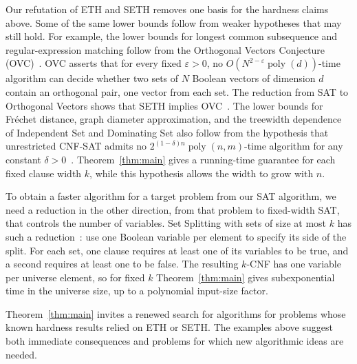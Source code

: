 \documentclass[11pt,reqno]{amsart}
\numberwithin{equation}{section}
\theoremstyle{definition}\newtheorem{definition}[theorem]{Definition}
\theoremstyle{remark}\newtheorem{remark}[theorem]{Remark}
\newcommand{\poly}{\operatorname{poly}}
\begin{document}
Our refutation of ETH and SETH removes one basis for the hardness claims
above. Some of the same lower bounds follow from weaker hypotheses that
may still hold. For example, the lower bounds for longest common
subsequence and regular-expression matching follow from the Orthogonal
Vectors Conjecture (OVC)~\cite{BK15,BI16}. OVC asserts that for every
fixed $\varepsilon>0$, no $O(N^{2-\varepsilon}\poly(d))$-time algorithm
can decide whether two sets of $N$ Boolean vectors of dimension $d$
contain an orthogonal pair, one vector from each set. The reduction
from SAT to Orthogonal Vectors shows that SETH implies OVC~\cite{Wil05,VW19}.
The lower bounds for Fr\'echet distance, graph diameter approximation,
and the treewidth dependence of Independent Set and Dominating Set also
follow from the hypothesis that unrestricted CNF-SAT admits no
$2^{(1-\delta)n}\poly(n,m)$-time algorithm for any constant
$\delta>0$~\cite{Bri14,RV13,LMS18}. Theorem~\ref{thm:main} gives a
running-time guarantee for each fixed clause width $k$, while this
hypothesis allows the width to grow with $n$.

To obtain a faster algorithm for a target problem from our SAT algorithm,
we need a reduction in the other direction, from that problem to
fixed-width SAT, that controls the number of variables. Set Splitting
with sets of size at most $k$ has such a
reduction~\cite[Observation~3.6]{CDL16}: use one Boolean variable per
element to specify its side of the split. For each set, one clause
requires at least one of its variables to be true, and a second requires
at least one to be false. The resulting $k$-CNF has one variable per
universe element, so for fixed $k$ Theorem~\ref{thm:main} gives
subexponential time in the universe size, up to a polynomial input-size
factor.

Theorem~\ref{thm:main} invites a renewed search for algorithms for
problems whose known hardness results relied on ETH or SETH. The
examples above suggest both immediate consequences and problems for
which new algorithmic ideas are needed.
\end{document}

